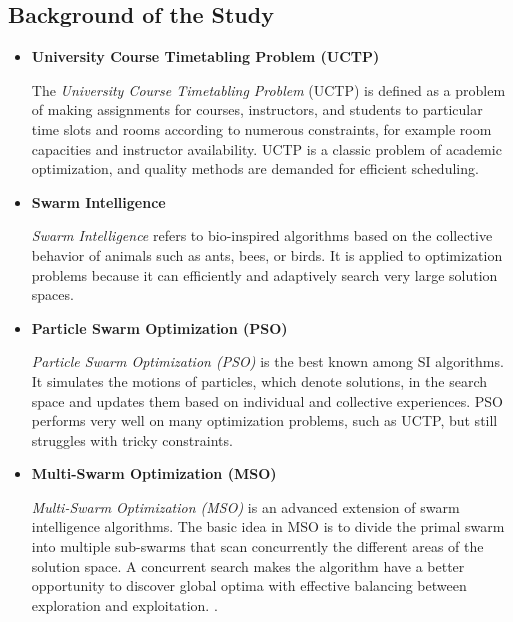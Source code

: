 \documentclass{article}
\newenvironment{subs}
  {\adjustwidth{3em}{0pt}}
  {\endadjustwidth}
\begin{document}
\begin{subs}
\subsection{Background of the Study}
\label{subsec:background}
\begin{itemize}
    \item[] \textbf{University Course Timetabling Problem (UCTP)}
    
    The \textit{University Course Timetabling Problem} (UCTP) is defined as a problem of making assignments for courses, instructors, and students to particular time slots and rooms according to numerous constraints, for example room capacities and instructor availability.\cite{Zhang2014-ak} \cite{Oswald_C2013-zo} \cite{Chen2013-cp} UCTP is a classic problem of academic optimization, and quality methods are demanded for efficient scheduling.\cite{Arratia-Martinez2021-io} \cite{Lih2018-km} \cite{Yang2017-ly} 

    \item[] \textbf{Swarm Intelligence}
    
    \textit{Swarm Intelligence} refers to bio-inspired algorithms based on the collective behavior of animals such as ants, bees, or birds. \cite{Gao2024-apso} \cite{Fallahi2022-qpso} It is applied to optimization problems because it can efficiently and adaptively search very large solution spaces. \cite{Oswald_C2013-zo} \cite{Gao2024-apso}

    \item[] \textbf{Particle Swarm Optimization (PSO)}
    
    \textit{Particle Swarm Optimization (PSO)} is the best known among SI algorithms. \cite{Liu2017-clqpso} It simulates the motions of particles, which denote solutions, in the search space and updates them based on individual and collective experiences. \cite{kennedy1995particle} \cite{Ali2014-mb} \cite{Zhan2009-apso} PSO performs very well on many optimization problems, such as UCTP, but still struggles with tricky constraints. \cite{Oswald_C2013-zo} \cite{Chen2013-cp} 

    \item[] \textbf{Multi-Swarm Optimization (MSO)} 

    \textit{Multi-Swarm Optimization (MSO)} is an advanced extension of swarm intelligence algorithms. \cite{blackwell2004multi} The basic idea in MSO is to divide the primal swarm into multiple sub-swarms that scan concurrently the different areas of the solution space. A concurrent search makes the algorithm have a better opportunity to discover global optima with effective balancing between exploration and exploitation. \cite{Bacanin2022-multiswarm}.


\end{itemize}
\end{subs}
\end{document}
